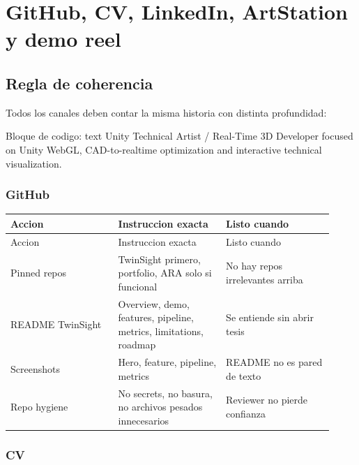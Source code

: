 \chapter{GitHub, CV, LinkedIn, ArtStation y demo reel}

\section{Regla de coherencia}


Todos los canales deben contar la misma historia con distinta profundidad:


\begin{mdcode}
Bloque de codigo: text
Unity Technical Artist / Real-Time 3D Developer focused on Unity WebGL, CAD-to-realtime optimization and interactive technical visualization.
\end{mdcode}


\subsection{GitHub}


\begin{center}
\scriptsize
\begin{longtable}{>{\raggedright\arraybackslash}p{0.305\linewidth} >{\raggedright\arraybackslash}p{0.305\linewidth} >{\raggedright\arraybackslash}p{0.305\linewidth}}
\toprule
Accion & Instruccion exacta & Listo cuando \\
\midrule
\endfirsthead
\toprule
Accion & Instruccion exacta & Listo cuando \\
\midrule
\endhead
Pinned repos & TwinSight primero, portfolio, ARA solo si funcional & No hay repos irrelevantes arriba \\
README TwinSight & Overview, demo, features, pipeline, metrics, limitations, roadmap & Se entiende sin abrir tesis \\
Screenshots & Hero, feature, pipeline, metrics & README no es pared de texto \\
Repo hygiene & No secrets, no basura, no archivos pesados innecesarios & Reviewer no pierde confianza \\
\bottomrule
\end{longtable}
\end{center}



\subsection{CV}


